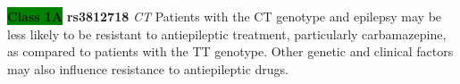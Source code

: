 \documentclass{book}
\begin{document}
\begin{center}



\textbf{\colorbox{green} {Class 1A}} \textbf{ rs3812718 } \textit{ CT }
Patients with the CT genotype and epilepsy may be less likely to be resistant to antiepileptic treatment, particularly carbamazepine, as compared to patients with the TT genotype. Other genetic and clinical factors may also influence resistance to antiepileptic drugs.

\end{center}
\end{document}
